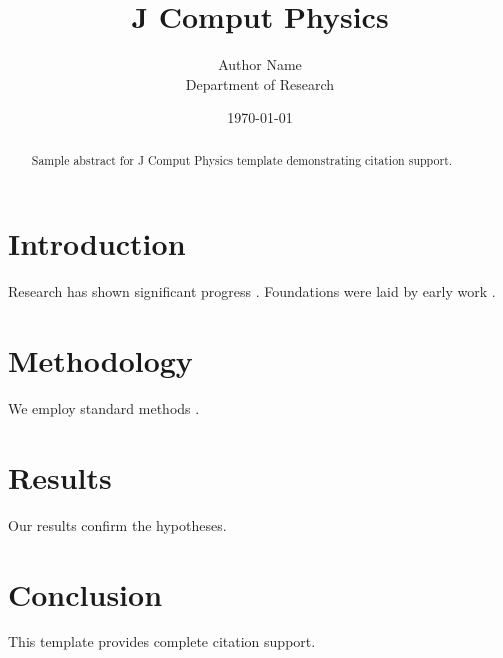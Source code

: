 \documentclass{llncs}
\title{J Comput Physics}
\author{Author Name \\ \small Department of Research}
\date{\today}
\begin{document}
\maketitle

\begin{abstract}
Sample abstract for J Comput Physics template demonstrating citation support.
\end{abstract}

\section{Introduction}
Research has shown significant progress \citep{einstein1905}. Foundations were laid by early work \citep{turing1950}.

\section{Methodology}
We employ standard methods \citep{knuth1984}.

\section{Results}
Our results confirm the hypotheses.

\section{Conclusion}
This template provides complete citation support.



\end{document}
